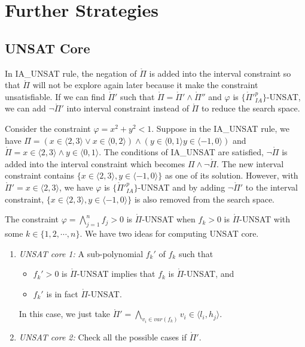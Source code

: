 \chapter{Further Strategies}
\section{UNSAT Core}
In \tiny IA\_UNSAT \normalsize rule, the negation of $\mathring\Pi$ is added into the interval constraint so that $\mathring\Pi$ will not be explore again later because it make the constraint unsatisfiable. If we can find $\mathring\Pi'$ such that $\mathring\Pi = \mathring\Pi' \wedge \mathring\Pi''$ and $\varphi$ is $\{\mathring\Pi'^p_{IA}\}$-UNSAT, we can add $\neg\mathring\Pi'$ into interval constraint instead of $\mathring\Pi$ to reduce the search space.

\begin{example}
Consider the constraint $\varphi = x^2 + y^2 < 1$. Suppose in the \tiny IA\_UNSAT \normalsize rule, we have $\Pi = (x \in \langle 2, 3 \rangle \vee x \in \langle 0, 2 \rangle) \wedge (y \in \langle 0, 1 \rangle y \in \langle -1, 0 \rangle)$ and $\mathring\Pi = x \in \langle 2, 3 \rangle \wedge y \in \langle 0, 1 \rangle$. The conditions of \tiny IA\_UNSAT \normalsize are satisfied, $\neg \mathring\Pi$ is added into the interval constraint which becomes $\Pi \wedge \neg \mathring\Pi$. The new interval constraint contains $\{x \in \langle 2, 3 \rangle, y \in \langle -1, 0 \rangle\}$ as one of its solution. However, with $\mathring\Pi' = x \in \langle 2, 3 \rangle$, we have $\varphi$ is $\{\mathring\Pi'^p_{IA}\}$-UNSAT and by adding $\neg\mathring\Pi'$ to the interval constraint, $\{x \in \langle 2, 3 \rangle, y \in \langle -1, 0 \rangle\}$ is also removed from the search space.
\end{example}

The constraint $\varphi = \bigwedge\limits_{j=1}^n f_j > 0$ is $\mathring\Pi$-UNSAT when $f_k > 0$ is $\mathring\Pi$-UNSAT with some $k \in \{1, 2, \cdots, n\}$. We have two ideas for computing UNSAT core.
\begin{enumerate}
\item \emph{UNSAT core 1:} A sub-polynomial $f_k'$ of $f_k$ such that
\begin{itemize}
\item $f_k' > 0$ is $\mathring\Pi$-UNSAT implies that $f_k$ is $\mathring\Pi$-UNSAT, and
\item $f_k'$ is in fact $\mathring\Pi$-UNSAT.
\end{itemize} 
In this case, we just take $\mathring\Pi' = \bigwedge\limits_{v_i \in var(f_k)}v_i \in \langle l_i, h_j \rangle$.
\item \emph{UNSAT core 2:} Check all the possible cases if $\mathring\Pi'$.
\end{enumerate}

